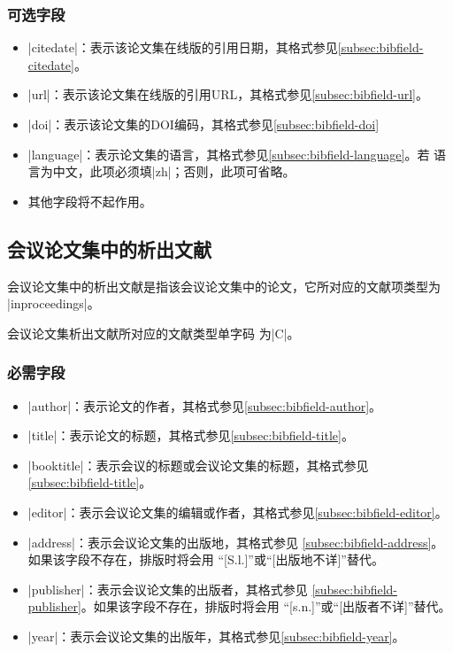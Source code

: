 \subsubsection{可选字段}

\begin{itemize}
\item |citedate|：表示该论文集在线版的引用日期，其格式参见\ref{subsec:bibfield-citedate}。
\item |url|：表示该论文集在线版的引用URL，其格式参见\ref{subsec:bibfield-url}。
\item |doi|：表示该论文集的DOI编码，其格式参见\ref{subsec:bibfield-doi}
\item |language|：表示论文集的语言，其格式参见\ref{subsec:bibfield-language}。若
  语言为中文，此项必须填|zh|；否则，此项可省略。
\item 其他字段将不起作用。
\end{itemize}

\subsection{会议论文集中的析出文献}\label{subsec:bibtype-inproceedings}

会议论文集中的析出文献是指该会议论文集中的论文，它所对应的{\BibTeX}文献项类型为
|inproceedings|。

会议论文集析出文献所对应的文献类型\cite{gbt3469-1983}单字码
为|C|。

\subsubsection{必需字段}

\begin{itemize}
\item |author|：表示论文的作者，其格式参见\ref{subsec:bibfield-author}。
\item |title|：表示论文的标题，其格式参见\ref{subsec:bibfield-title}。
\item |booktitle|：表示会议的标题或会议论文集的标题，其格式参见\ref{subsec:bibfield-title}。
\item |editor|：表示会议论文集的编辑或作者，其格式参见\ref{subsec:bibfield-editor}。
\item |address|：表示会议论文集的出版地，其格式参见
  \ref{subsec:bibfield-address}。如果该字段不存在，{\BibTeX}排版时将会用
  ``[S.l.]''或``[出版地不详]''替代。
\item |publisher|：表示会议论文集的出版者，其格式参见
  \ref{subsec:bibfield-publisher}。如果该字段不存在，{\BibTeX}排版时将会用
  ``[s.n.]''或``[出版者不详]''替代。
\item |year|：表示会议论文集的出版年，其格式参见\ref{subsec:bibfield-year}。
\end{itemize}

